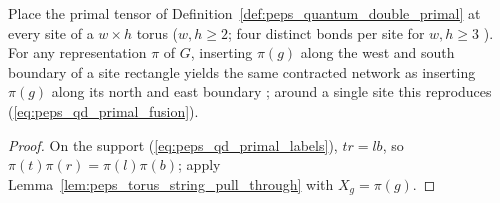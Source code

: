 \begin{lemma}%
    \label{thm:peps_quantum_double_primal_network}
    \leanok
    Place the primal tensor of Definition~\ref{def:peps_quantum_double_primal} at every site of a $w\times h$ torus ($w,h\ge2$; four distinct bonds per site for $w,h\ge3$ \cite{gap:rmp_peps_examples_small_torus}). For any representation $\pi$ of $G$, inserting $\pi(g)$ along the west and south boundary of a site rectangle yields the same contracted network as inserting $\pi(g)$ along its north and east boundary \cite[Appendix~A, ``The Toric Code and quantum double models'']{Cirac2021Matrix}; around a single site this reproduces (\ref{eq:peps_qd_primal_fusion}).
\end{lemma}

\begin{proof}\leanok
    On the support (\ref{eq:peps_qd_primal_labels}), $tr=lb$, so $\pi(t)\pi(r)=\pi(l)\pi(b)$; apply Lemma~\ref{lem:peps_torus_string_pull_through} with $X_g=\pi(g)$.
\end{proof}
